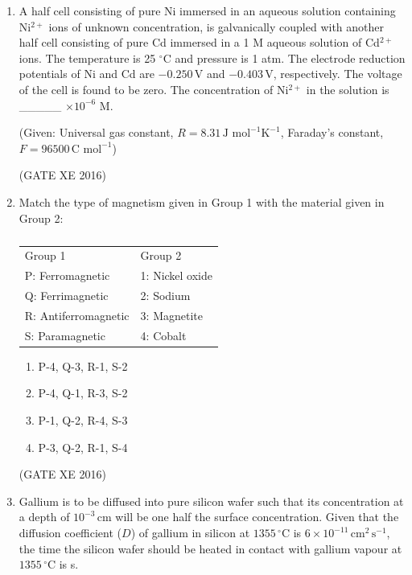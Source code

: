 \documentclass[12pt]{article}
\begin{document}
\begin{enumerate}
(GATE XE 2016)

\item A half cell consisting of pure Ni immersed in an aqueous solution containing Ni$^{2+}$ ions of unknown concentration, is galvanically coupled with another half cell consisting of pure Cd immersed in a 1 M aqueous solution of Cd$^{2+}$ ions. The temperature is 25 $^\circ$C and pressure is 1 atm. The electrode reduction potentials of Ni and Cd are $-0.250 \, \text{V}$ and $-0.403 \, \text{V}$, respectively. The voltage of the cell is found to be zero. The concentration of Ni$^{2+}$ in the solution is \_\_\_\_\_ $\times 10^{-6}$ M.  

(Given: Universal gas constant, $R = 8.31 \, \text{J mol}^{-1} \text{K}^{-1}$, Faraday’s constant, $F = 96500 \, \text{C mol}^{-1}$)  

(GATE XE 2016)

\item Match the type of magnetism given in Group 1 with the material given in Group 2:  

\begin{table}[H]
\centering
\caption{}
\label{}
\begin{tabular}{ll}
Group 1 & Group 2 \\
P: Ferromagnetic & 1: Nickel oxide \\
Q: Ferrimagnetic & 2: Sodium \\
R: Antiferromagnetic & 3: Magnetite \\
S: Paramagnetic & 4: Cobalt \\
\end{tabular}
\end{table}

\begin{multicols}{2}
\begin{enumerate}
  \item P-4, Q-3, R-1, S-2
  \item P-4, Q-1, R-3, S-2
  \item P-1, Q-2, R-4, S-3
  \item P-3, Q-2, R-1, S-4
\end{enumerate}
\end{multicols}
(GATE XE 2016)

\item Gallium is to be diffused into pure silicon wafer such that its concentration at a depth of $10^{-3} \, \text{cm}$ will be one half the surface concentration. Given that the diffusion coefficient ($D$) of gallium in silicon at $1355 \, ^\circ$C is $6 \times 10^{-11} \, \text{cm}^2 \, \text{s}^{-1}$, the time the silicon wafer should be heated in contact with gallium vapour at $1355 \, ^\circ$C is \underline{\hspace{2cm}} s.  


\end{enumerate}
\end{document}
